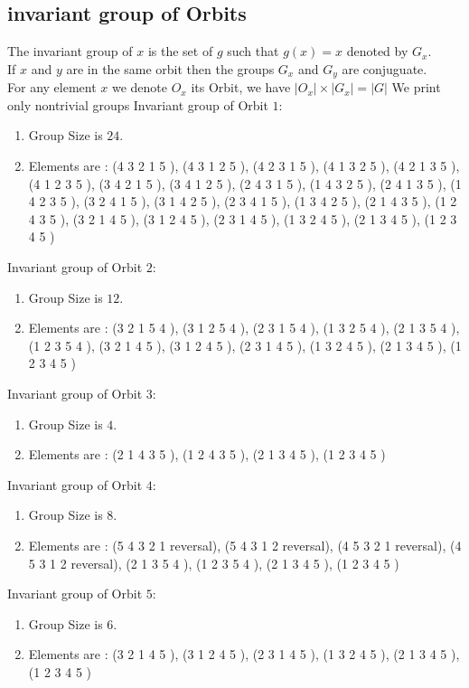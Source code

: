 \documentclass[12pt]{article}
\begin{document}
\subsection{invariant group of Orbits}
\noindent The invariant group of $x$ is the set of $g$ such that $g(x)=x$ denoted by $G_x$.\\
If $x$ and $y$ are in the same orbit then the groups $G_x$ and  $G_y$ are conjuguate.\\
For any element $x$ we denote $O_x$ its Orbit, we have $|O_x|\times |G_x|=|G|$
We print only nontrivial groups
Invariant group of Orbit $1$:
\begin{enumerate}
\item Group Size is $24$.
\item Elements are : (4 3 2 1 5  ), (4 3 1 2 5  ), (4 2 3 1 5  ), (4 1 3 2 5  ), (4 2 1 3 5  ), (4 1 2 3 5  ), (3 4 2 1 5  ), (3 4 1 2 5  ), (2 4 3 1 5  ), (1 4 3 2 5  ), (2 4 1 3 5  ), (1 4 2 3 5  ), (3 2 4 1 5  ), (3 1 4 2 5  ), (2 3 4 1 5  ), (1 3 4 2 5  ), (2 1 4 3 5  ), (1 2 4 3 5  ), (3 2 1 4 5  ), (3 1 2 4 5  ), (2 3 1 4 5  ), (1 3 2 4 5  ), (2 1 3 4 5  ), (1 2 3 4 5  )
\end{enumerate}
Invariant group of Orbit $2$:
\begin{enumerate}
\item Group Size is $12$.
\item Elements are : (3 2 1 5 4  ), (3 1 2 5 4  ), (2 3 1 5 4  ), (1 3 2 5 4  ), (2 1 3 5 4  ), (1 2 3 5 4  ), (3 2 1 4 5  ), (3 1 2 4 5  ), (2 3 1 4 5  ), (1 3 2 4 5  ), (2 1 3 4 5  ), (1 2 3 4 5  )
\end{enumerate}
Invariant group of Orbit $3$:
\begin{enumerate}
\item Group Size is $4$.
\item Elements are : (2 1 4 3 5  ), (1 2 4 3 5  ), (2 1 3 4 5  ), (1 2 3 4 5  )
\end{enumerate}
Invariant group of Orbit $4$:
\begin{enumerate}
\item Group Size is $8$.
\item Elements are : (5 4 3 2 1   reversal), (5 4 3 1 2   reversal), (4 5 3 2 1   reversal), (4 5 3 1 2   reversal), (2 1 3 5 4  ), (1 2 3 5 4  ), (2 1 3 4 5  ), (1 2 3 4 5  )
\end{enumerate}
Invariant group of Orbit $5$:
\begin{enumerate}
\item Group Size is $6$.
\item Elements are : (3 2 1 4 5  ), (3 1 2 4 5  ), (2 3 1 4 5  ), (1 3 2 4 5  ), (2 1 3 4 5  ), (1 2 3 4 5  )
\end{enumerate}
\end{document}
